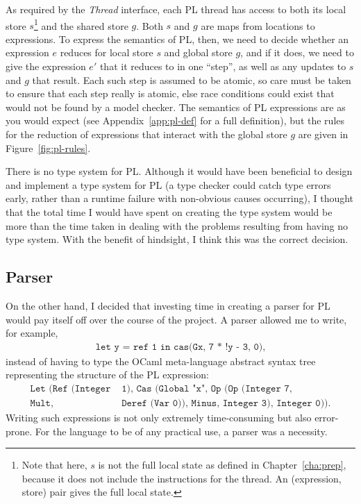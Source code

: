 \documentclass[12pt,a4paper,twoside,openright]{report}
\begin{document}
As required by the \emph{Thread} interface, each
PL thread has access to both its local store
$s$\footnote{Note that
	here, $s$ is not the full local state
	as defined in Chapter~\ref{cha:prep},
	because it does not include the instructions
	for the thread. An (expression, store) pair
	gives the full local state.}
and the shared store $g$. Both $s$ and $g$ are
maps from locations to expressions.
To express the semantics
of PL, then, we need to decide whether an
expression $e$ reduces for local store $s$ and
global store $g$, and if it does, we need to give
the expression $e'$ that it reduces to in one ``step'',
as well as any updates to $s$ and $g$ that result.
Each such step is assumed to be atomic, so care
must be taken to ensure that each step really is
atomic, else race conditions could exist that would
not be found by a model checker.
The semantics of PL expressions are as you would expect
(see Appendix~\ref{app:pl-def} for a full definition), but
the rules for the reduction of expressions that interact
with the global store $g$ are given in Figure~\ref{fig:pl-rules}.

There is no type system for PL. Although it would have been
beneficial to design and implement a type system for PL
(a type checker could catch type errors early, rather than a runtime
failure with non-obvious causes occurring), I thought that the total
time I would have spent on creating the type system would be more than
the time taken in dealing with the problems resulting from having
no type system. With the benefit of hindsight, I think this was the
correct decision.

\subsection{Parser}
On the other hand, I decided that investing time in creating a
parser for PL would pay itself off over the course of the project.
A parser allowed me to write, for example,
\begin{align*}
	\texttt{let y = ref 1 in cas(Gx, 7 * !y - 3, 0)},
\end{align*}
instead of having to type the OCaml meta-language abstract
syntax tree representing the structure of the PL expression:
\begin{align*}
	\texttt{Let (Ref (Integer}& \texttt{ 1), Cas (Global "x",
		Op (Op (Integer 7,} \\ \texttt{Mult,}& \texttt{ Deref (Var 0)), Minus, Integer 3),
		Integer 0))}.
\end{align*}
Writing such expressions is not only extremely time-consuming but
also error-prone. For the language to be of any practical use,
a parser was a necessity.
\end{document}
